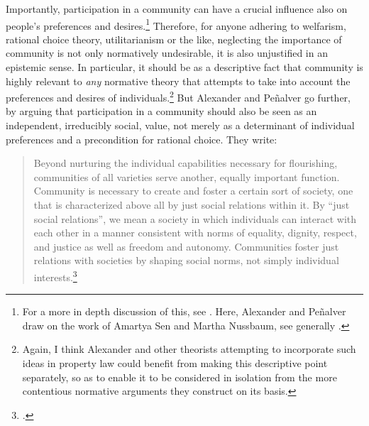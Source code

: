 Importantly, participation in a community can have a crucial influence also on people's preferences and desires.\footnote{For a more in depth discussion of this, see \cite[140]{alexander09}. Here, Alexander and Pe\~{n}alver draw on the work of Amartya Sen and Martha Nussbaum, see generally \cite{sen84,sen85,sen99,nussbaum00,nussbaum02}.}
Therefore, for anyone adhering to welfarism, rational choice theory, utilitarianism or the like, neglecting the importance of community is not only normatively undesirable, it is also unjustified in an epistemic sense. In particular, it should be  as a descriptive fact that community is highly relevant to {\it any} normative theory that attempts to take into account the preferences and desires of individuals.\footnote{Again, I think Alexander and other theorists attempting to incorporate such ideas in property law could benefit from making this descriptive point separately, so as to enable it to be considered in isolation from the more contentious normative arguments they construct on its basis.} But Alexander and Pe\~{n}alver go further, by arguing that participation in a community should also be seen as an independent, irreducibly social, value, not merely as a determinant of individual preferences and a precondition for rational choice. They write:

\begin{quote}
Beyond nurturing the individual capabilities necessary for flourishing, communities of all varieties serve another, equally important function. Community is necessary to create and foster a certain sort of society, one that is characterized above all by just social relations within it. By ``just social relations'', we mean a society in which individuals can interact with each other in a manner consistent with norms of equality, dignity, respect, and justice as well as freedom and autonomy. Communities foster just relations with societies by shaping social norms, not simply individual interests.\footcite[140]{alexander09}
\end{quote}

